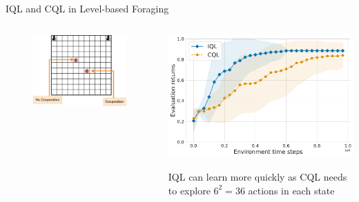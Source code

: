 \begin{frame}{IQL and CQL in Level-based Foraging}

\begin{columns}
    \begin{column}{0.5\textwidth}
    \begin{figure}
        \centering
        \includegraphics[width=\textwidth,height=.8\textheight,keepaspectratio]{images/environments/lbf/tabular_marl_lbf_annot.pdf}
        \label{fig:enter-label}
        
    \end{figure}
        
    \end{column}
    
    \begin{column}{0.5\textwidth}
    \vspace{10pt}
        \centering
        \includegraphics[width=\textwidth,height=.8\textheight,keepaspectratio]{images/chapter_5/tabular_marl_lbf_returns_iql_cql.pdf}
        \label{fig:enter-label}
        \blist
            \item IQL can learn more quickly as CQL needs to explore $6^2 = 36$ actions in each state
        \elist
        
    \end{column}
\end{columns}
    
\end{frame}

